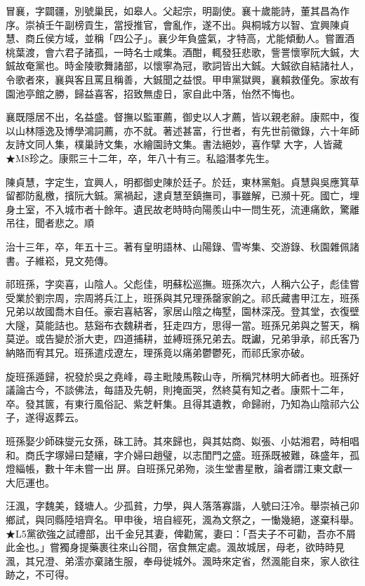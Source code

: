 \begin{pinyinscope}
冒襄，字闢疆，別號巢民，如皋人。父起宗，明副使。襄十歲能詩，董其昌為作序。崇禎壬午副榜貢生，當授推官，會亂作，遂不出。與桐城方以智、宜興陳貞慧、商丘侯方域，並稱「四公子」。襄少年負盛氣，才特高，尤能傾動人。嘗置酒桃葉渡，會六君子諸孤，一時名士咸集。酒酣，輒發狂悲歌，訾詈懷寧阮大鋮，大鋮故奄黨也。時金陵歌舞諸部，以懷寧為冠，歌詞皆出大鋮。大鋮欲自結諸社人，令歌者來，襄與客且罵且稱善，大鋮聞之益恨。甲申黨獄興，襄賴救僅免。家故有園池亭館之勝，歸益喜客，招致無虛日，家自此中落，怡然不悔也。

襄既隱居不出，名益盛。督撫以監軍薦，御史以人才薦，皆以親老辭。康熙中，復以山林隱逸及博學鴻詞薦，亦不就。著述甚富，行世者，有先世前徽錄，六十年師友詩文同人集，樸巢詩文集，水繪園詩文集。書法絕妙，喜作擘大字，人皆藏★M8珍之。康熙三十二年，卒，年八十有三。私謚潛孝先生。

陳貞慧，字定生，宜興人，明都御史陳於廷子。於廷，東林黨魁。貞慧與吳應箕草留都防亂檄，擯阮大鋮。黨禍起，逮貞慧至鎮撫司，事雖解，已瀕十死。國亡，埋身土室，不入城市者十餘年。遺民故老時時向陽羨山中一問生死，流連痛飲，驚離吊往，聞者悲之。順

治十三年，卒，年五十三。著有皇明語林、山陽錄、雪岑集、交游錄、秋園雜佩諸書。子維崧，見文苑傳。

祁班孫，字奕喜，山陰人。父彪佳，明蘇松巡撫。班孫次六，人稱六公子，彪佳嘗受業於劉宗周，宗周將兵江上，班孫與其兄理孫罄家餉之。祁氏藏書甲江左，班孫兄弟以故國喬木自任。豪宕喜結客，家居山陰之梅墅，園林深茂。登其堂，衣復壁大隧，莫能詰也。慈谿布衣魏耕者，狂走四方，思得一當。班孫兄弟與之誓天，稱莫逆。或告變於浙大吏，四道捕耕，並縛班孫兄弟去。既讞，兄弟爭承，祁氏客乃納賂而宥其兄。班孫遣戍遼左，理孫竟以痛弟鬱鬱死，而祁氏家亦破。

旋班孫遁歸，祝發於吳之堯峰，尋主毗陵馬鞍山寺，所稱咒林明大師者也。班孫好議論古今，不談佛法，每語及先朝，則掩面哭，然終莫有知之者。康熙十二年，卒。發其篋，有東行風俗記、紫芝軒集。且得其遺教，命歸祔，乃知為山陰祁六公子，遂得返葬云。

班孫娶少師硃燮元女孫，硃工詩。其來歸也，與其姑商、姒張、小姑湘君，時相唱和。商氏字塚婦曰楚纕，字介婦曰趙璧，以志閨門之盛。班孫既被難，硃盛年，孤燈緇帳，數十年未嘗一出屏。自班孫兄弟歾，淡生堂書星散，論者謂江東文獻一大厄運也。

汪渢，字魏美，錢塘人。少孤貧，力學，與人落落寡諧，人號曰汪冷。舉崇禎己卯鄉試，與同縣陸培齊名。甲申後，培自經死，渢為文祭之，一慟幾絕，遂棄科舉。★L5黨欲強之試禮部，出千金兒其妻，俾勸駕，妻曰：「吾夫子不可勸，吾亦不屑此金也。」嘗獨身提藥裹往來山谷間，宿食無定處。渢故城居，母老，欲時時見渢，其兄澄、弟澐亦棄諸生服，奉母徙城外。渢時來定省，然渢能自來，家人欲往跡之，不可得。


\end{pinyinscope}
